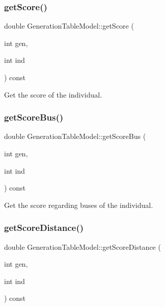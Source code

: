 \subsubsection{\texorpdfstring{get\+Score()}{getScore()}}
{\footnotesize\ttfamily double Generation\+Table\+Model\+::get\+Score (\begin{DoxyParamCaption}\item[{int}]{gen,  }\item[{int}]{ind }\end{DoxyParamCaption}) const}



Get the score of the individual. 

\mbox{\label{class_generation_table_model_ac6ba8b04c5cdc79b3611090045c82be2}} 
\subsubsection{\texorpdfstring{get\+Score\+Bus()}{getScoreBus()}}
{\footnotesize\ttfamily double Generation\+Table\+Model\+::get\+Score\+Bus (\begin{DoxyParamCaption}\item[{int}]{gen,  }\item[{int}]{ind }\end{DoxyParamCaption}) const}



Get the score regarding buses of the individual. 

\mbox{\label{class_generation_table_model_a4c8dec508fc7f18ea5dcc1d609cd01c8}} 
\subsubsection{\texorpdfstring{get\+Score\+Distance()}{getScoreDistance()}}
{\footnotesize\ttfamily double Generation\+Table\+Model\+::get\+Score\+Distance (\begin{DoxyParamCaption}\item[{int}]{gen,  }\item[{int}]{ind }\end{DoxyParamCaption}) const}



